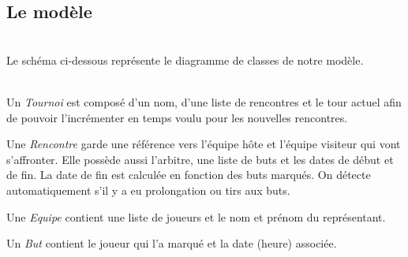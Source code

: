\documentclass[10pt]{report}
\begin{document}
\subsection{Le modèle}
~\\
Le schéma ci-dessous représente le diagramme de classes de notre modèle. \\
	\begin{figure}[here]
	      \begin{center}	      
	      \end{center}
	\end{figure}
\\

Un \textit{Tournoi} est composé d'un nom, d'une liste de rencontres et le tour actuel afin de pouvoir l'incrémenter en temps voulu pour les nouvelles rencontres.

Une \textit{Rencontre} garde une référence vers l'équipe hôte et l'équipe visiteur qui vont s'affronter.
Elle possède aussi l'arbitre, une liste de buts et les dates de début et de fin.
La date de fin est calculée en fonction des buts marqués. On détecte automatiquement s'il y a eu prolongation ou tirs aux buts.

Une \textit{Equipe} contient une liste de joueurs et le nom et prénom du représentant.

Un \textit{But} contient  le joueur qui l'a marqué et la date (heure) associée.
 
\end{document}
